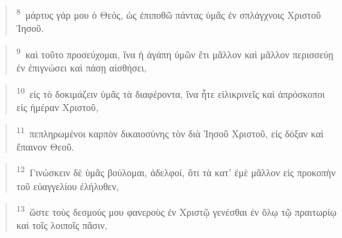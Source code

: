 \documentclass{article}
\newcommand{\currentverse}{1} %
\newcommand{\setcurrentverse}[1]{\renewcommand{\currentverse}{#1}}
\begin{document}
\begin{verse}

\setcurrentverse{8}

\setcounter{footnote}{0}

\textsuperscript{8}~μάρτυς γάρ μου ὁ Θεός, ὡς ἐπιποθῶ πάντας ὑμᾶς ἐν σπλάγχνοις Χριστοῦ Ἰησοῦ.

\end{verse}

\begin{verse}

\setcurrentverse{9}

\setcounter{footnote}{0}

\textsuperscript{9}~καὶ τοῦτο προσεύχομαι, ἵνα ἡ ἀγάπη ὑμῶν ἔτι μᾶλλον καὶ μᾶλλον περισσεύῃ ἐν ἐπιγνώσει καὶ πάσῃ αἰσθήσει,

\end{verse}

\begin{verse}

\setcurrentverse{10}

\setcounter{footnote}{0}

\textsuperscript{10}~εἰς τὸ δοκιμάζειν ὑμᾶς τὰ διαφέροντα, ἵνα ἦτε εἰλικρινεῖς καὶ ἀπρόσκοποι εἰς ἡμέραν Χριστοῦ,

\end{verse}

\begin{verse}

\setcurrentverse{11}

\setcounter{footnote}{0}

\textsuperscript{11}~πεπληρωμένοι καρπὸν δικαιοσύνης τὸν διὰ Ἰησοῦ Χριστοῦ, εἰς δόξαν καὶ ἔπαινον Θεοῦ.

\end{verse}

\begin{verse}

\setcurrentverse{12}

\setcounter{footnote}{0}

\textsuperscript{12}~Γινώσκειν δὲ ὑμᾶς βούλομαι, ἀδελφοί, ὅτι τὰ κατ’ ἐμὲ μᾶλλον εἰς προκοπὴν τοῦ εὐαγγελίου ἐλήλυθεν,

\end{verse}

\begin{verse}

\setcurrentverse{13}

\setcounter{footnote}{0}

\textsuperscript{13}~ὥστε τοὺς δεσμούς μου φανεροὺς ἐν Χριστῷ γενέσθαι ἐν ὅλῳ τῷ πραιτωρίῳ καὶ τοῖς λοιποῖς πᾶσιν,

\end{verse}
\end{document}
